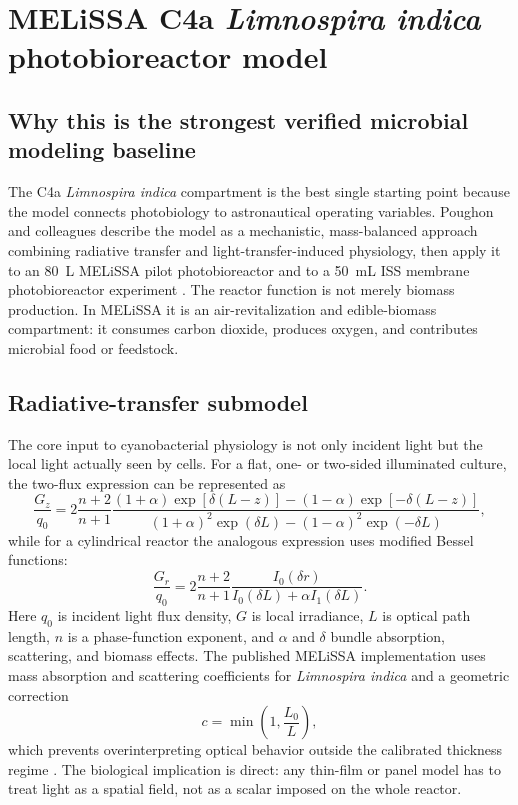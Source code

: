 \documentclass[11pt]{article}
\newcommand{\MEL}{MELiSSA}
\newcommand{\Limno}{\textit{Limnospira indica}}
\begin{document}
\section{MELiSSA C4a \Limno{} photobioreactor model}

\subsection{Why this is the strongest verified microbial modeling baseline}

The C4a \Limno{} compartment is the best single starting point because the model connects photobiology to astronautical operating variables. Poughon and colleagues describe the model as a mechanistic, mass-balanced approach combining radiative transfer and light-transfer-induced physiology, then apply it to an \SI{80}{L} \MEL{} pilot photobioreactor and to a \SI{50}{mL} ISS membrane photobioreactor experiment \parencite[1, 6, 8--9]{poughon2021}. The reactor function is not merely biomass production. In \MEL{} it is an air-revitalization and edible-biomass compartment: it consumes carbon dioxide, produces oxygen, and contributes microbial food or feedstock.

\subsection{Radiative-transfer submodel}

The core input to cyanobacterial physiology is not only incident light but the local light actually seen by cells. For a flat, one- or two-sided illuminated culture, the two-flux expression can be represented as
\begin{equation}
\frac{G_z}{q_0}
=2\frac{n+2}{n+1}
\frac{(1+\alpha)\exp[\delta(L-z)]-(1-\alpha)\exp[-\delta(L-z)]}
{(1+\alpha)^2\exp(\delta L)-(1-\alpha)^2\exp(-\delta L)},
\label{eq:flat_radiative}
\end{equation}
while for a cylindrical reactor the analogous expression uses modified Bessel functions:
\begin{equation}
\frac{G_r}{q_0}
=2\frac{n+2}{n+1}
\frac{I_0(\delta r)}{I_0(\delta L)+\alpha I_1(\delta L)}.
\label{eq:cyl_radiative}
\end{equation}
Here $q_0$ is incident light flux density, $G$ is local irradiance, $L$ is optical path length, $n$ is a phase-function exponent, and $\alpha$ and $\delta$ bundle absorption, scattering, and biomass effects. The published \MEL{} implementation uses mass absorption and scattering coefficients for \Limno{} and a geometric correction
\begin{equation}
  c=\min\left(1,\frac{L_0}{L}\right),
  \label{eq:geometric_correction}
\end{equation}
which prevents overinterpreting optical behavior outside the calibrated thickness regime \parencite[2]{poughon2021}. The biological implication is direct: any thin-film or panel model has to treat light as a spatial field, not as a scalar imposed on the whole reactor.
\end{document}

